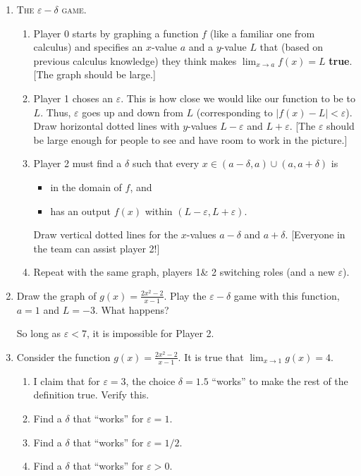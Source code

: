 \documentclass[12pt]{amsart}
\def\de{\delta}
\def\ds{\displaystyle}
\def\e{\varepsilon}
\numberwithin{equation}{section}
\theoremstyle{plain} %
\theoremstyle{definition}
\theoremstyle{remark}
\begin{document}
\begin{enumerate}
\item \textsc{The $\e-\de$ game.}
\begin{enumerate}
\item Player 0 starts by graphing a function $f$ (like a familiar one from calculus) and specifies an $x$-value $a$ and a $y$-value $L$ that (based on previous calculus knowledge) they think makes $\lim_{x\to a} f(x) = L$ \textbf{true}. [The graph should be large.]
\item Player 1 choses an $\e$. This is how close we would like our function to be to $L$. Thus, $\e$ goes up and down from $L$ (corresponding to $|f(x)-L|<\e$). Draw horizontal dotted lines with $y$-values $L-\e$ and $L+\e$. [The $\e$ should be large enough for people to see and have room to work in the picture.]
\item Player 2 must find a $\de$ such that every $x \in (a-\de,a) \cup (a,a+\de)$ is 
\begin{itemize}
\item in the domain of $f$, and
\item has an output $f(x)$ within $(L-\e,L+\e)$.
\end{itemize}
Draw vertical dotted lines for the $x$-values $a-\de$ and $a+\de$. 
[Everyone in the team can assist player 2!]
\item Repeat with the same graph, players 1\& 2 switching roles (and a new $\e$).
\end{enumerate}


\item Draw the graph of $\ds g(x)=\frac{2x^2-2}{x-1}$. Play the $\e-\de$ game with this function, $a=1$ and $L=-3$. What happens?

\begin{framed}
So long as $\e<7$, it is impossible for Player 2.
\end{framed}




\item Consider the function $\ds g(x)=\frac{2x^2-2}{x-1}$. It is true that ${\lim_{x\to 1}  g(x) = 4}$.
\begin{enumerate}
\item I claim that for $\e=3$, the choice $\delta=1.5$ ``works'' to make the rest of the definition true. Verify this.
\item Find a $\delta$ that ``works'' for $\e=1$.
\item Find a $\delta$ that ``works'' for $\e=1/2$.
\item Find a $\delta$ that ``works'' for $\e>0$.
\end{enumerate}


\end{enumerate}
\end{document}
